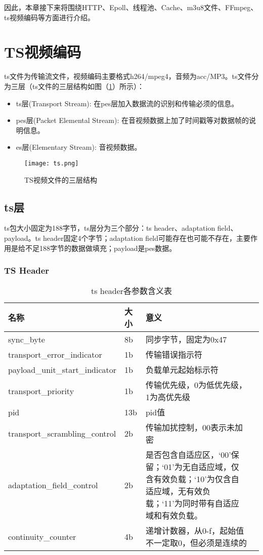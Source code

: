 \documentclass[bachelor]{thesis-uestc}
\begin{document}
\par 因此，本章接下来将围绕HTTP、Epoll、线程池、Cache、m3u8文件、FFmpeg、ts视频编码等方面进行介绍。

\section{TS视频编码}

ts文件为传输流文件，视频编码主要格式h264/mpeg4，音频为acc/MP3。ts文件分为三层（ts文件的三层结构如图（\ref{fig:ts}）所示）：

\begin{itemize}
	\item ts层(Transport Stream): 在pes层加入数据流的识别和传输必须的信息。
	\item pes层(Packet Elemental Stream): 在音视频数据上加了时间戳等对数据帧的说明信息。
	\item es层(Elementary Stream): 音视频数据。
\end{itemize}


\begin{figure}[h]
\texttt{[image: ts.png]}
\caption{TS视频文件的三层结构}
\label{fig:ts} 
\end{figure}

\subsection{ts层}
ts包大小固定为188字节，ts层分为三个部分：ts header、adaptation field、 payload。ts header固定4个字节；adaptation field可能存在也可能不存在，主要作用是给不足188字节的数据做填充；payload是pes数据。

\subsubsection{TS Header}

\begin{table}[!h]
\centering
\caption{ts header各参数含义表}
\label{ts header各参数含义表}
\begin{tabular}{lp{3cm}p{6cm}p{2cm}}
\toprule
名称	&  大小 & 意义 \\
\midrule

sync\_byte	& 8b &	同步字节，固定为0x47\\
transport\_error\_indicator	& 1b &	传输错误指示符\\
payload\_unit\_start\_indicator	& 1b & 	负载单元起始标示符\\
transport\_priority	& 1b &	传输优先级，0为低优先级，1为高优先级\\
pid	& 13b &	pid值\\
transport\_scrambling\_control	& 2b &	传输加扰控制，00表示未加密\\
adaptation\_field\_control	& 2b &	是否包含自适应区，‘00’保留；‘01’为无自适应域，仅含有效负载；‘10’为仅含自适应域，无有效负载；‘11’为同时带有自适应域和有效负载。\\
continuity\_counter	& 4b & 	递增计数器，从0-f，起始值不一定取0，但必须是连续的\\
\bottomrule 
\end{tabular}
\end{table}
\end{document}
